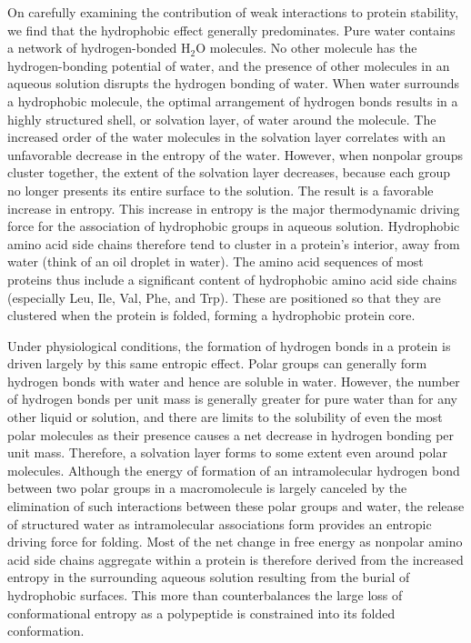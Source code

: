 On carefully examining the contribution of weak interactions to protein stability, we find that the hydrophobic effect generally predominates. Pure water contains a network of hydrogen-bonded H$_2$O molecules. No other molecule has the hydrogen-bonding potential of water, and the presence of other molecules in an aqueous solution disrupts the hydrogen bonding of water. When water surrounds a hydrophobic molecule, the optimal arrangement of hydrogen bonds results in a highly structured shell, or solvation layer, of water around the molecule. The increased order of the water molecules in the solvation layer correlates with an unfavorable decrease in the entropy of the water. However, when nonpolar groups cluster together, the extent of the solvation layer decreases, because each group no longer presents its entire surface to the solution. The result is a favorable increase in entropy. This increase in entropy is the major thermodynamic driving force for the association of hydrophobic groups in aqueous solution. Hydrophobic amino acid side chains therefore tend to cluster in a protein's interior, away from water (think of an oil droplet in water). The amino acid sequences of most proteins thus include a significant content of hydrophobic amino acid side chains (especially Leu, Ile, Val, Phe, and Trp). These are positioned so that they are clustered when the protein is folded, forming a hydrophobic protein core. 

Under physiological conditions, the formation of hydrogen bonds in a protein is driven largely by this same entropic effect. Polar groups can generally form hydrogen bonds with water and hence are soluble in water. However, the number of hydrogen bonds per unit mass is generally greater for pure water than for any other liquid or solution, and there are limits to the solubility of even the most polar molecules as their presence causes a net decrease in hydrogen bonding per unit mass. Therefore, a solvation layer forms to some extent even around polar molecules. Although the energy of formation of an intramolecular hydrogen bond between two polar groups in a macromolecule is largely canceled by the elimination of such interactions between these polar groups and water, the release of structured water as intramolecular associations form provides an entropic driving force for folding. Most of the net change in free energy as nonpolar amino acid side chains aggregate within a protein is therefore derived from the increased entropy in the surrounding aqueous solution resulting from the burial of hydrophobic surfaces. This more than counterbalances the large loss of conformational entropy as a polypeptide is constrained into its folded conformation. 

